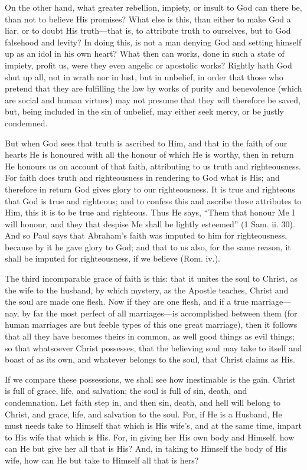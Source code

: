 On the other hand, what greater rebellion, impiety, or insult to God can
there be, than not to believe His promises? What else is this, than either
to make God a liar, or to doubt His truth—that is, to attribute
truth to ourselves, but to God falsehood and levity? In doing this, is not
a man denying God and setting himself up as an idol in his own heart? What
then can works, done in such a state of impiety, profit us, were they even
angelic or apostolic works? Rightly hath God shut up all, not in wrath nor
in lust, but in unbelief, in order that those who pretend that they are
fulfilling the law by works of purity and benevolence (which are social
and human virtues) may not presume that they will therefore be saved, but,
being included in the sin of unbelief, may either seek mercy, or be justly
condemned.

But when God sees that truth is ascribed to Him, and that in the faith of
our hearts He is honoured with all the honour of which He is worthy, then
in return He honours us on account of that faith, attributing to us truth
and righteousness. For faith does truth and righteousness in rendering to
God what is His; and therefore in return God gives glory to our
righteousness. It is true and righteous that God is true and righteous;
and to confess this and ascribe these attributes to Him, this it is to be
true and righteous. Thus He says, ``Them that honour Me I will honour, and
they that despise Me shall be lightly esteemed'' (1 Sam. ii. 30). And so
Paul says that Abraham's faith was imputed to him for righteousness,
because by it he gave glory to God; and that to us also, for the same
reason, it shall be imputed for righteousness, if we believe (Rom. iv.).

The third incomparable grace of faith is this: that it unites the soul to
Christ, as the wife to the husband, by which mystery, as the Apostle
teaches, Christ and the soul are made one flesh. Now if they are one
flesh, and if a true marriage—nay, by far the most perfect of all
marriages—is accomplished between them (for human marriages are but
feeble types of this one great marriage), then it follows that all they
have becomes theirs in common, as well good things as evil things; so that
whatsoever Christ possesses, that the believing soul may take to itself
and boast of as its own, and whatever belongs to the soul, that Christ
claims as His.

If we compare these possessions, we shall see how inestimable is the gain.
Christ is full of grace, life, and salvation; the soul is full of sin,
death, and condemnation. Let faith step in, and then sin, death, and hell
will belong to Christ, and grace, life, and salvation to the soul. For, if
He is a Husband, He must needs take to Himself that which is His wife's,
and at the same time, impart to His wife that which is His. For, in giving
her His own body and Himself, how can He but give her all that is His?
And, in taking to Himself the body of His wife, how can He but take to
Himself all that is hers?

